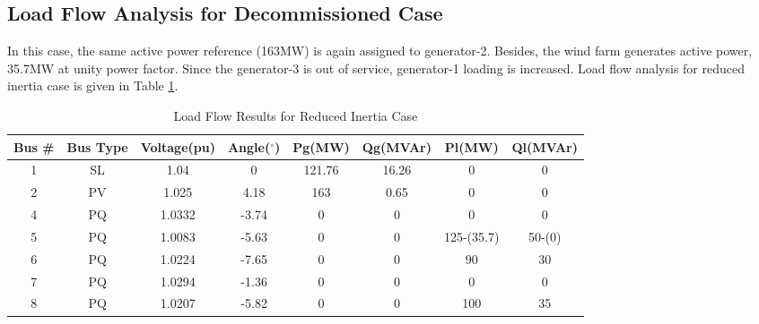 \subsection{Load Flow Analysis for Decommissioned Case}
In this case, the same active power reference (163MW) is again assigned to generator-2. Besides, the wind farm generates active power, 35.7MW at unity power factor. Since the generator-3 is out of service, generator-1 loading is increased. Load flow analysis for reduced inertia case is given in Table \ref{loadflow_case3}.
\begin{table}[h!]
	\centering
	\resizebox{\textwidth}{!}
	{
	\begin{tabular}{cclccccc}
		\hline
		Bus \# & Bus Type & \multicolumn{1}{c}{Voltage(pu)} & Angle($^{\circ}$)& Pg(MW)    & Qg(MVAr)     & Pl(MW)  & Ql(MVAr)   \\ \hline
		1      & SL       & \multicolumn{1}{c}{1.04}    & 0     & 121.76& 16.26  & 0   & 0  \\
		2      & PV       & \multicolumn{1}{c}{1.025}   & 4.18  & 163   & 0.65   & 0   & 0  \\
		4      & PQ       & \multicolumn{1}{c}{1.0332}                      & -3.74 & 0     & 0      & 0   & 0  \\
		5      & PQ       & \multicolumn{1}{c}{1.0083}                      & -5.63 & 0     & 0      & 125-(35.7) & 50-(0)\\
		6      & PQ       & \multicolumn{1}{c}{1.0224}                      & -7.65 & 0     & 0      & 90  & 30 \\
		7      & PQ       & \multicolumn{1}{c}{1.0294}                      & -1.36 & 0     & 0      & 0   & 0  \\
		8      & PQ       & \multicolumn{1}{c}{1.0207}                      & -5.82 & 0     & 0      & 100 & 35 \\
 \hline
	\end{tabular}
}
	\caption{Load Flow Results for Reduced Inertia Case}
	\label{loadflow_case3}
\end{table}
